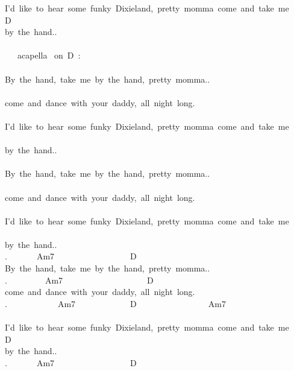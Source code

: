 {I'd\ like\ to\ hear\ some\ funky\ Dixieland,\ pretty\ momma\ come\ and\ take\ me\\
D\ \ \ \ \ \ \ \ \ \ \ \ \\
by\ the\ hand..\\
\\
\ \ \ acapella \ on\ D\ :\\
\ \ \ \ \ \ \ \ \ \ \ \ \ \ \ \ \ \ \ \ \ \\
By\ the\ hand,\ take\ me\ by\ the\ hand,\ pretty\ momma..\\
\ \ \ \ \ \ \ \ \ \ \ \ \ \ \ \ \ \ \ \ \ \ \ \ \ \ \ \ \\
come\ and\ dance\ with\ your\ daddy,\ all\ night\ long.\\
\ \ \ \ \ \ \ \ \ \ \ \ \ \ \ \ \ \ \ \ \ \ \ \ \\
I'd\ like\ to\ hear\ some\ funky\ Dixieland,\ pretty\ momma\ come\ and\ take\ me\\
\ \ \ \ \ \ \ \ \ \ \ \ \\
by\ the\ hand..\\
\ \ \ \ \ \\
By\ the\ hand,\ take\ me\ by\ the\ hand,\ pretty\ momma..\\
\ \ \ \ \ \ \\
come\ and\ dance\ with\ your\ daddy,\ all\ night\ long.\\
\ \ \ \ \ \ \ \ \ \ \ \ \ \ \ \ \ \ \ \ \ \ \ \ \\
I'd\ like\ to\ hear\ some\ funky\ Dixieland,\ pretty\ momma\ come\ and\ take\ me\\
\ \ \ \ \ \ \ \ \ \ \ \ \\
by\ the\ hand..\\
.\ \ \ \ \ \ \ Am7\ \ \ \ \ \ \ \ \ \ \ \ \ \ \ \ \ \ D\\
By\ the\ hand,\ take\ me\ by\ the\ hand,\ pretty\ momma..\\
.\ \ \ \ \ \ \ \ \ Am7\ \ \ \ \ \ \ \ \ \ \ \ \ \ \ \ \ \ \ \ D\\
come\ and\ dance\ with\ your\ daddy,\ all\ night\ long.\\
.\ \ \ \ \ \ \ \ \ \ \ \ Am7\ \ \ \ \ \ \ \ \ \ \ \ \ D\ \ \ \ \ \ \ \ \ \ \ \ \ \ \ \ \ Am7\ \ \ \ \ \ \ \ \ \ \ \ \ \ \ \ \ \ \ \ \ \ \ \ \ \ \ \\
I'd\ like\ to\ hear\ some\ funky\ Dixieland,\ pretty\ momma\ come\ and\ take\ me\\
D\ \ \ \ \ \ \ \ \ \ \ \ \\
by\ the\ hand..\\
.\ \ \ \ \ \ \ Am7\ \ \ \ \ \ \ \ \ \ \ \ \ \ \ \ \ \ D\\
}
